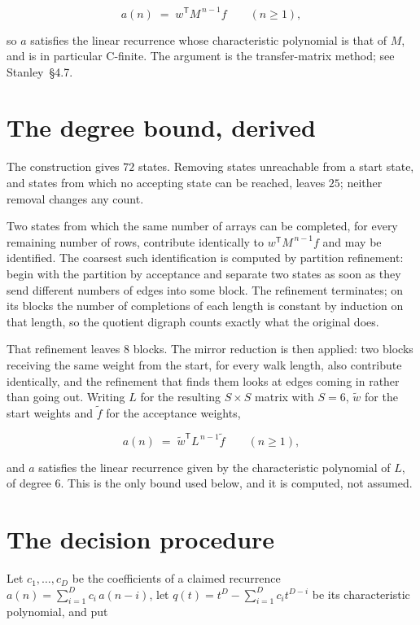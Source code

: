 \documentclass[11pt]{article}
\theoremstyle{definition}
\begin{document}
\[a(n) \;=\; w^{\mathsf T} M^{\,n-1} f \qquad (n \ge 1),\]

so $a$ satisfies the linear recurrence whose characteristic polynomial is that of $M$, and is in particular C-finite. The argument is the transfer-matrix method; see Stanley~\S4.7.

\section{The degree bound, derived}

The construction gives $72$ states. Removing states unreachable from a start state, and states from which no accepting state can be reached, leaves $25$; neither removal changes any count.

Two states from which the same number of arrays can be completed, for every remaining number of rows, contribute identically to $w^{\mathsf T}M^{\,n-1}f$ and may be identified. The coarsest such identification is computed by partition refinement: begin with the partition by acceptance and separate two states as soon as they send different numbers of edges into some block. The refinement terminates; on its blocks the number of completions of each length is constant by induction on that length, so the quotient digraph counts exactly what the original does.

That refinement leaves $8$ blocks. The mirror reduction is then applied: two blocks receiving the same weight from the start, for every walk length, also contribute identically, and the refinement that finds them looks at edges coming in rather than going out. Writing $L$ for the resulting $S \times S$ matrix with $S = 6$, $\tilde w$ for the start weights and $\tilde f$ for the acceptance weights,

\[a(n) \;=\; \tilde w^{\mathsf T} L^{\,n-1} \tilde f \qquad (n \ge 1),\]

and $a$ satisfies the linear recurrence given by the characteristic polynomial of $L$, of degree $6$. This is the only bound used below, and it is computed, not assumed.

\section{The decision procedure}

Let $c_1,\dots,c_D$ be the coefficients of a claimed recurrence $a(n) = \sum_{i=1}^{D} c_i\,a(n-i)$, let $q(t) = t^{D} - \sum_{i=1}^{D} c_i t^{D-i}$ be its characteristic polynomial, and put
\end{document}
